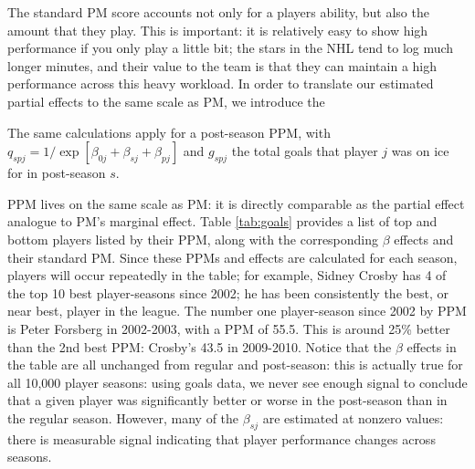 The standard PM score accounts not only for a players ability, but also the
amount that they play.  This is important: it is relatively easy to show high
performance if you only play a little bit; the stars in the NHL tend to log
much longer minutes, and their value to the team is that they can maintain a
high performance across this heavy workload.  In order to translate our
estimated partial effects to the same scale as PM, we introduce the
The same calculations apply for a post-season PPM, with $q_{spj} =
1/\exp[\beta_{0j} + \beta_{sj}+ \beta_{pj}]$ and $g_{spj}$ the total goals
that player $j$ was on ice for in post-season $s$.

PPM lives on the same scale as PM: it is directly comparable as the partial
effect analogue to PM's marginal effect.  Table \ref{tab:goals} provides a
list of top and bottom players listed by their PPM, along with the
corresponding $\beta$ effects and their standard PM.  Since these PPMs and
effects are calculated for each season, players will occur repeatedly in the
table; for example, Sidney Crosby has 4 of the top 10 best player-seasons
since 2002; he has been consistently the best, or near best, player in the
league.  The number one player-season since 2002 by PPM is Peter Forsberg in 2002-2003,
with a PPM of 55.5.  This is around 25\% better than the 2nd best PPM:
Crosby's 43.5 in 2009-2010.  Notice that the $\beta$ effects in the table are
all unchanged from regular and post-season: this is actually true for all
10,000 player seasons: using goals data, we never see enough signal to conclude
that a given player was significantly better or worse in the post-season than
in the regular season.  However, many of the $\beta_{sj}$ are estimated at
nonzero values: there is measurable signal indicating that player performance
changes across seasons.

